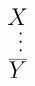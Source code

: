 \documentclass[14pt,border=2pt]{standalone}
\begin{document}
        $$
        \LARGE 

\begin{prooftree}
\hypo{X} \ellipsis{}{ \overline{Y} }
\end{prooftree}
        $$
        
\end{document}
